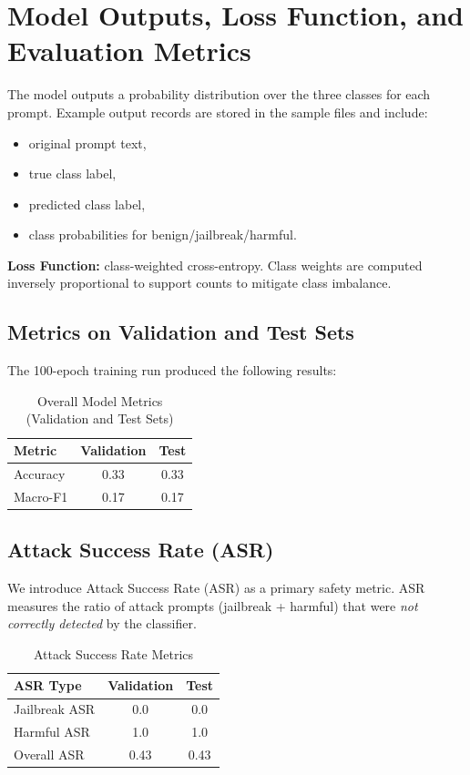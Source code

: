\documentclass[11pt]{article}
\begin{document}
\section{Model Outputs, Loss Function, and Evaluation Metrics}
The model outputs a probability distribution over the three classes for each prompt. Example output records are stored in the sample files and include:
\begin{itemize}[leftmargin=*]
\item original prompt text,
\item true class label,
\item predicted class label,
\item class probabilities for benign/jailbreak/harmful.
\end{itemize}

\textbf{Loss Function:} class-weighted cross-entropy. Class weights are computed inversely proportional to support counts to mitigate class imbalance.

\subsection{Metrics on Validation and Test Sets}
The 100-epoch training run produced the following results:

\begin{table}[h]
\centering
\caption{Overall Model Metrics (Validation and Test Sets)}
\begin{tabular}{|l|c|c|}
\hline
\textbf{Metric} & \textbf{Validation} & \textbf{Test} \\
\hline
Accuracy & 0.33 & 0.33 \\
Macro-F1 & 0.17 & 0.17 \\
\hline
\end{tabular}
\end{table}

\subsection{Attack Success Rate (ASR)}
We introduce Attack Success Rate (ASR) as a primary safety metric. ASR measures the ratio of attack prompts (jailbreak + harmful) that were \emph{not correctly detected} by the classifier.

\begin{table}[h]
\centering
\caption{Attack Success Rate Metrics}
\begin{tabular}{|l|c|c|}
\hline
\textbf{ASR Type} & \textbf{Validation} & \textbf{Test} \\
\hline
Jailbreak ASR & 0.0 & 0.0 \\
Harmful ASR & 1.0 & 1.0 \\
Overall ASR & 0.43 & 0.43 \\
\hline
\end{tabular}
\end{table}
\end{document}
